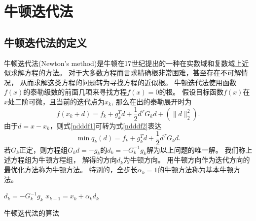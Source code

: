 \section{牛顿迭代法}
\subsection{牛顿迭代法的定义}
    牛顿迭代法(Newton's method)是牛顿在17世纪提出的一种在实数域和复数域上近似求解方程的方法。
    对于大多数方程而言求精确根非常困难，甚至存在不可解情况，
    从而求解这类方程的问题转为寻找方程的近似根。
    牛顿迭代法使用函数$f(x)$的泰勒级数的前面几项来寻找方程$f(x)=0$的根。
    假设目标函数$f(x)$在$x$处二阶可微，且当前的迭代点为$x_k$,
    那么在出的泰勒展开时为
    \begin{equation}
        f(x_k+d) = f_k + g_k^Td+\frac{1}{2}d^TG_kd + (\|d\|_2^2).
        \label{ndddf1}
    \end{equation}
    由于$d = x - x_k$，则式\ref{ndddf1}可转为式\ref{ndddf2}表达
    \begin{equation}
        \mathop{\mathrm{min}} q_k(d) = f_k + g_k^Td+\frac{1}{2}d^TG_kd.
        \label{ndddf2}
    \end{equation}
    若$G_k$正定，则方程组$G_kd=-g_k$的$d_k=-G_k^{-1}g_k$解为以上问题的唯一解。
    我们称上述方程组为牛顿方程组，
    解得的方向$d_k$为牛顿方向。
    用牛顿方向作为迭代方向的最优化方法称为牛顿方法。
    特别的，全步长$\alpha_k=1$的牛顿方法称为基本牛顿方法。
    \begin{algorithm}
        \SetAlgoLined
         {
            $d_k=-G_k^{-1}g_k$
            $x_{k+1}=x_k+\alpha_kd_k$
        }
        \caption{牛顿迭代法的算法}
    \end{algorithm}
    
